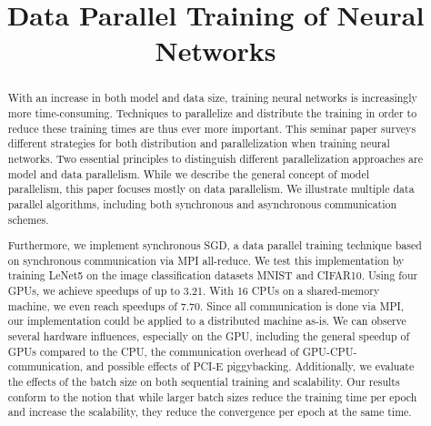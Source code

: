 \documentclass[conference,compsoc,a4paper]{IEEEtran}
\begin{document}
\title{Data Parallel Training of Neural Networks}


\author{
}


\maketitle

\begin{abstract}
With an increase in both model and data size, training neural networks is increasingly more time-consuming.
Techniques to parallelize and distribute the training in order to reduce these training times are thus ever more important.
This seminar paper surveys different strategies for both distribution and parallelization when training neural networks.
Two essential principles to distinguish different parallelization approaches are model and data parallelism.
While we describe the general concept of model parallelism, this paper focuses mostly on data parallelism.
We illustrate multiple data parallel algorithms, including both synchronous and asynchronous communication schemes.

Furthermore, we implement synchronous SGD, a data parallel training technique based on synchronous communication via MPI all-reduce.
We test this implementation by training LeNet5 on the image classification datasets MNIST and CIFAR10.
Using four GPUs, we achieve speedups of up to 3.21.
With 16 CPUs on a shared-memory machine, we even reach speedups of 7.70.
Since all communication is done via MPI, our implementation could be applied to a distributed machine as-is.
We can observe several hardware influences, especially on the GPU, including the general speedup of GPUs compared to the CPU, the communication overhead of GPU-CPU-communication, and possible effects of PCI-E piggybacking.
Additionally, we evaluate the effects of the batch size on both sequential training and scalability.
Our results conform to the notion that while larger batch sizes reduce the training time per epoch and increase the scalability, they reduce the convergence per epoch at the same time.

\end{abstract}
\end{document}
